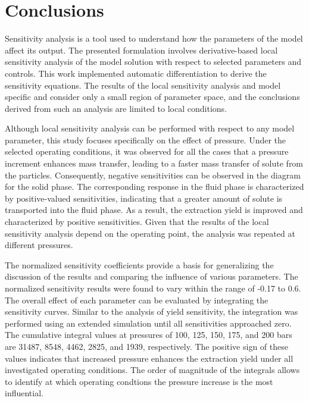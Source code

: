 \documentclass[a4paper,fleqn]{cas-dc}
\begin{document}
	\section{Conclusions} \label{CH: Conclusion}
	
	Sensitivity analysis is a tool used to understand how the parameters of the model affect its output. The presented formulation involves derivative-based local sensitivity analysis of the model solution with respect to selected parameters and controls. This work implemented automatic differentiation to derive the sensitivity equations. The results of the local sensitivity analysis and model specific and consider only a small region of parameter space, and the conclusions derived from such an analysis are limited to local conditions.
	
	Although local sensitivity analysis can be performed with respect to any model parameter, this study focuses specifically on the effect of pressure. Under the selected operating conditions, it was observed for all the cases that a pressure increment enhances mass transfer, leading to a faster mass transfer of solute from the particles. Consequently, negative sensitivities can be observed in the diagram for the solid phase. The corresponding response in the fluid phase is characterized by positive-valued sensitivities, indicating that a greater amount of solute is transported into the fluid phase. As a result, the extraction yield is improved and characterized by positive sensitivities. Given that the results of the local sensitivity analysis depend on the operating point, the analysis was repeated at different pressures. 
	
	{\color{blue}The normalized sensitivity coefficients provide a basis for generalizing the discussion of the results and comparing the influence of various parameters. The normalized sensitivity results were found to vary within the range of -0.17 to 0.6. The overall effect of each parameter can be evaluated by integrating the sensitivity curves. Similar to the analysis of yield sensitivity, the integration was performed using an extended simulation until all sensitivities approached zero. The cumulative integral values at pressures of 100, 125, 150, 175, and 200 bars are 31487, 8548, 4462, 2825, and 1939, respectively. The positive sign of these values indicates that increased pressure enhances the extraction yield under all investigated operating conditions. The order of magnitude of the integrals allows to identify at which operating condtions the pressure increase is the most influential.}
	
\end{document}
